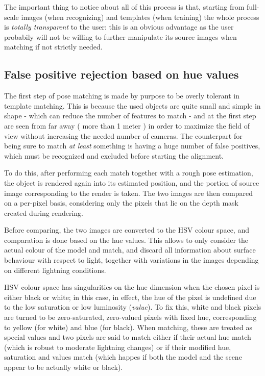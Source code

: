 The important thing to notice about all of this process is that,
starting from full-scale images (when recognizing) and templates (when
training) the whole process is \emph{totally transparent} to the user:
this is an obvious advantage as the user probabily will not be willing
to further manipulate its source images when matching if not strictly needed.

\subsection{False positive rejection based on hue values}
The first step of pose matching is made by purpose to be overly tolerant in
template matching. This is because the used objects are quite small and simple
in shape - which can reduce the number of features to match - and at the first
step are seen from far away ( more than 1 meter ) in order to maximize the
field of view without increasing the needed number of cameras. The counterpart
for being sure to match \emph{at least} something is having a huge number of
  false positives, which must be recognized and excluded before starting the
  alignment.


To do this, after performing each match together with a rough pose estimation,
the object is rendered again into its estimated position, and the portion of
source image corresponding to the render is taken. The two images are then
compared on a per-pixel basis, considering only the pixels that lie on the
depth mask created during rendering. 

Before comparing, the two images are converted to the HSV colour space, and
comparation is done based on the hue values. This allows to only consider the
actual colour of the model and match, and discard all information about
surface behaviour with respect to light, together with variations in the images
depending on different lightning conditions.

HSV colour space has singularities on the hue dimension when the chosen pixel is
either black or white; in this case, in effect, the hue of the pixel is
undefined due to the low saturation or low luminosity (\emph{value}). To fix
this, white and black pixels are turned to be zero-saturated, zero-valued
pixels with fixed hue, corresponding to yellow (for white) and blue (for
black). When matching, these are treated as special values and two pixels are
said to match either if their actual hue match (which
is robust to moderate lightning changes) or if their modified hue, saturation
and values match
(which happes if both the model and the scene appear to be actually white or
black). 

